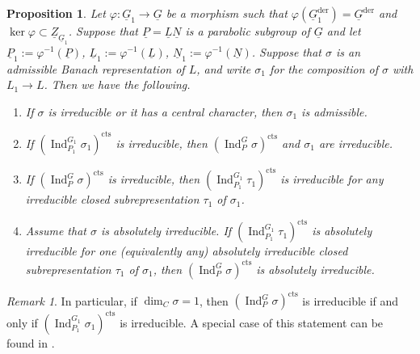 \documentclass[a4paper]{amsart}
\numberwithin{equation}{section}
\newtheorem{prop}[thm]{Proposition}
\theoremstyle{remark}
\newtheorem{remark}[thm]{Remark}
\theoremstyle{definition}
\DeclareMathOperator{\Ind}{Ind}
\newcommand{\alggrp}[1]{\underline{#1}}
\newcommand{\der}{\mathrm{der}}
\newcommand{\cts}{\mathrm{cts}}
\begin{document}
\begin{prop}\label{prop:isogenies}
Let $\varphi\colon \alggrp G_{1}\to \alggrp G$ be a morphism such that $\varphi(\alggrp{G}_{1}^{\der}) = \alggrp{G}^{\der}$ and $\ker\varphi\subset \alggrp{Z}_{\alggrp G_{1}}$.
Suppose that $\alggrp P = \alggrp L \alggrp N$ is a parabolic subgroup of $\alggrp G$ and let $\alggrp{P}_{1} := \varphi^{-1}(\alggrp{P})$, $\alggrp{L}_{1} := \varphi^{-1}(\alggrp{L})$, $\alggrp{N}_{1} := \varphi^{-1}(\alggrp{N})$.
Suppose that $\sigma$ is an admissible Banach representation of $L$, and
write $\sigma_{1}$ for the composition of $\sigma$ with $L_{1}\to L$.
Then we have the following.
\begin{enumerate}
\item If $\sigma$ is irreducible or it has a central character, then $\sigma_1$ is admissible.
\item If $(\Ind_{P_{1}}^{G_{1}}\sigma_{1})^{\cts}$ is irreducible, then $(\Ind_{P}^{G}\sigma)^{\cts}$ and $\sigma_{1}$ are irreducible.
\item If $(\Ind_{P}^{G}\sigma)^{\cts}$ is irreducible, then $(\Ind_{P_{1}}^{G_{1}}\tau_{1})^{\cts}$ is irreducible for any irreducible closed subrepresentation $\tau_{1}$ of $\sigma_{1}$.
\item Assume that $\sigma$ is absolutely irreducible.
If $(\Ind_{P_{1}}^{G_{1}}\tau_{1})^{\cts}$ is absolutely irreducible for one (equivalently any) absolutely irreducible closed subrepresentation $\tau_{1}$ of $\sigma_{1}$, then $(\Ind_{P}^{G}\sigma)^{\cts}$ is absolutely irreducible.
\end{enumerate}
\end{prop}

\begin{remark}\label{rk:isogenies}
In particular, if $\dim_C \sigma = 1$, then $(\Ind_{P}^{G}\sigma)^{\cts}$ is irreducible if and only if $(\Ind_{P_{1}}^{G_{1}}\sigma_{1})^{\cts}$ is irreducible.
A special case of this statement can be found in \cite[Proposition~2.3.2]{arxiv.1912.11125}.
\end{remark}
\end{document}
